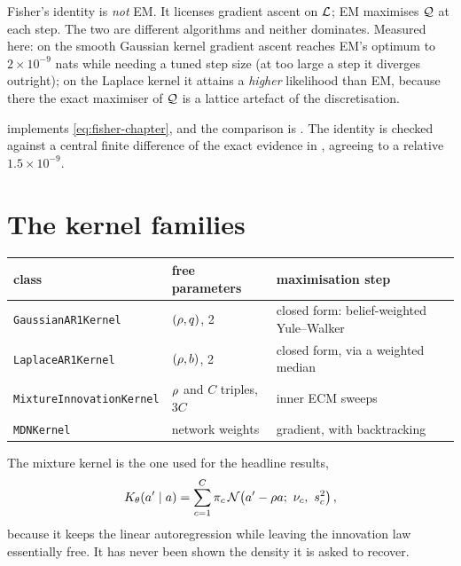 \begin{pitfall}
Fisher's identity is \emph{not} EM. It licenses gradient ascent on $\mathcal{L}$; EM maximises
$\mathcal{Q}$ at each step. The two are different algorithms and neither dominates. Measured here:
on the smooth Gaussian kernel gradient ascent reaches EM's optimum to $2\times10^{-9}$ nats
while needing a tuned step size (at too large a step it diverges outright); on the Laplace
kernel it attains a \emph{higher} likelihood than EM, because there the exact maximiser of
$\mathcal{Q}$ is a lattice artefact of the discretisation.
\end{pitfall}

\begin{codebox}
 implements \eqref{eq:fisher-chapter}, and
the comparison is
.
The identity is checked against a central finite difference of the exact
evidence in , agreeing to a relative
$1.5\times10^{-9}$.
\end{codebox}

\section{The kernel families}

\begin{center}\small
\begin{tabular}{@{}llp{7.2cm}@{}}
\toprule
class & free parameters & maximisation step \\
\midrule
\texttt{GaussianAR1Kernel} & $(\rho,q)$, 2 & closed form: belief-weighted Yule--Walker \\
\texttt{LaplaceAR1Kernel} & $(\rho,b)$, 2 & closed form, via a weighted median \\
\texttt{MixtureInnovationKernel} & $\rho$ and $C$ triples, $3C$ & inner ECM sweeps \\
\texttt{MDNKernel} & network weights & gradient, with backtracking \\
\bottomrule
\end{tabular}
\end{center}

The mixture kernel is the one used for the headline results,
\begin{equation}
\label{eq:mixture-kernel}
K_\theta(a'\mid a) = \sum_{c=1}^{C}\pi_c\,
\mathcal{N}\!\left(a'-\rho a;\ \nu_c,\ s_c^2\right),
\end{equation}
because it keeps the linear autoregression while leaving the innovation law essentially free.
It has never been shown the density it is asked to recover.

